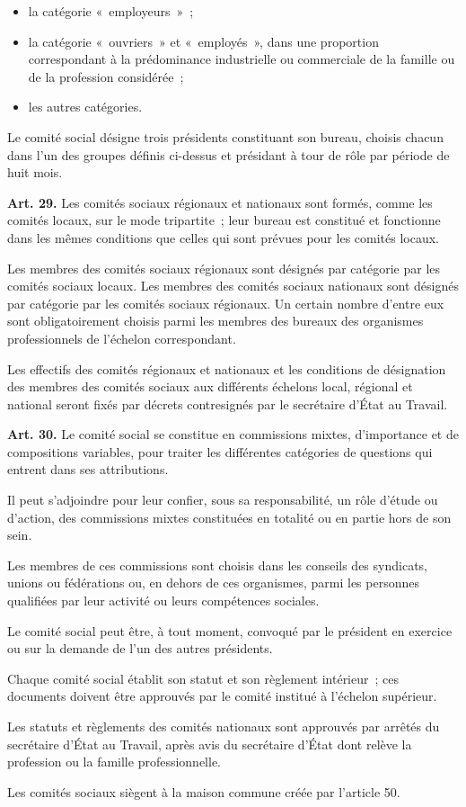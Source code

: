 \documentclass[french,twoside]{book} %
\newcommand{\labelchar}[1]{\textbf{\color{rubric} #1}}
\begin{document}
\begin{itemize}[itemsep=0pt,]
\item la catégorie « employeurs » ;
\item la catégorie « ouvriers » et « employés », dans une proportion correspondant à la prédominance industrielle ou commerciale de la famille ou de la profession considérée ;
\item les autres catégories.
\end{itemize}
\noindent Le comité social désigne trois présidents constituant son bureau, choisis chacun dans l’un des groupes définis ci-dessus et présidant à tour de rôle par période de huit mois.\par
\bigbreak
\noindent \labelchar{Art. 29.} Les comités sociaux régionaux et nationaux sont formés, comme les comités locaux, sur le mode tripartite ; leur bureau est constitué et fonctionne dans les mêmes conditions que celles qui sont prévues pour les comités locaux.\par
Les membres des comités sociaux régionaux sont désignés par catégorie par les comités sociaux locaux. Les membres des comités sociaux nationaux sont désignés par catégorie par les comités sociaux régionaux. Un certain nombre d’entre eux sont obligatoirement choisis parmi les membres des bureaux des organismes professionnels de l’échelon correspondant.\par
Les effectifs des comités régionaux et nationaux et les conditions de désignation des membres des comités sociaux aux différents échelons local, régional et national seront fixés par décrets contresignés par le secrétaire d’État au Travail.\par
\bigbreak
\noindent \labelchar{Art. 30.} Le comité social se constitue en commissions mixtes, d’importance et de compositions variables, pour traiter les différentes catégories de questions qui entrent dans ses attributions.\par
Il peut s’adjoindre pour leur confier, sous sa responsabilité, un rôle d’étude ou d’action, des commissions mixtes constituées en totalité ou en partie hors de son sein.\par
Les membres de ces commissions sont choisis dans les conseils des syndicats, unions ou fédérations ou, en dehors de ces organismes, parmi les personnes qualifiées par leur activité ou leurs compétences sociales.\par
Le comité social peut être, à tout moment, convoqué par le président en exercice ou sur la demande de l’un des autres présidents.\par
Chaque comité social établit son statut et son règlement intérieur ; ces documents doivent être approuvés par le comité institué à l’échelon supérieur.\par
Les statuts et règlements des comités nationaux sont approuvés par arrêtés du secrétaire d’État au Travail, après avis du secrétaire d’État dont relève la profession ou la famille professionnelle.\par
Les comités sociaux siègent à la maison commune créée par l’article 50.\par
\end{document}
